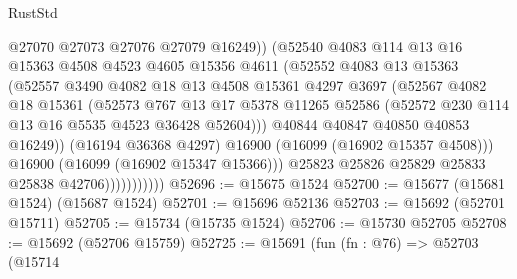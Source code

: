 \begin{lexlean}{RustStd}
\begin{coremodule}
                                @27070
                                @27073
                                @27076
                                @27079
                                @16249))
                            (@52540
                              @4083
                              @114
                              @13
                              @16
                              @15363
                              @4508
                              @4523
                              @4605
                              @15356
                              @4611
                              (@52552
                                @4083
                                @13
                                @15363
                                (@52557
                                  @3490
                                  @4082
                                  @18
                                  @13
                                  @4508
                                  @15361
                                  @4297
                                  @3697
                                  (@52567
                                    @4082
                                    @18
                                    @15361
                                    (@52573
                                      @767
                                      @13
                                      @17
                                      @5378
                                      @11265
                                      @52586
                                      (@52572 @230 @114 @13 @16 @5535 @4523 @36428 @52604)))
                                  @40844
                                  @40847
                                  @40850
                                  @40853
                                  @16249))
                              (@16194 @36368 @4297)
                              @16900
                              (@16099 (@16902 @15357 @4508)))
                            @16900
                            (@16099 (@16902 @15347 @15366)))
                          @25823
                          @25826
                          @25829
                          @25833
                          @25838
                          @42706)))))))))))
@52696 := @15675 @1524
@52700 := @15677 (@15681 @1524) (@15687 @1524)
@52701 := @15696 @52136
@52703 := @15692 (@52701 @15711)
@52705 := @15734 (@15735 @1524)
@52706 := @15730 @52705
@52708 := @15692 (@52706 @15759)
@52725 := @15691
    (fun (fn : @76) =>
    @52703
      (@15714

\end{coremodule}
\end{lexlean}
